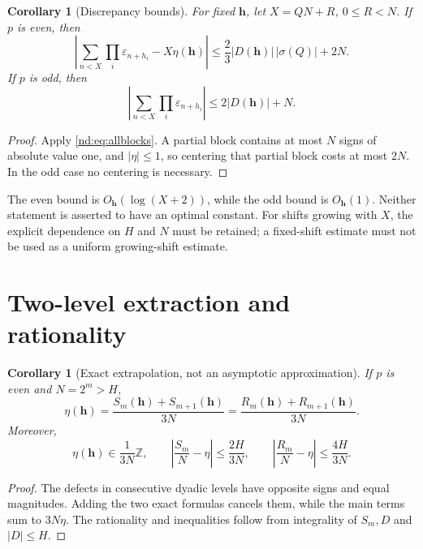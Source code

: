 \documentclass[11pt,a4paper,oneside,openany]{book}
\numberwithin{equation}{chapter}
\newtheorem{corollary}[theorem]{Corollary}
\theoremstyle{definition}
\theoremstyle{remark}
\newcommand{\eps}{\varepsilon}
\newcommand{\ZZ}{\mathbb Z}
\begin{document}
\begin{corollary}[Discrepancy bounds]
For fixed \(\bm h\), let \(X=QN+R\), \(0\le R<N\). If \(p\) is even, then
\begin{equation}
 \left|\sum_{n<X}\prod_i\eps_{n+h_i}-X\eta(\bm h)\right|
 \le \frac23|D(\bm h)|\,|\sigma(Q)|+2N.
 \label{nd:eq:disc-even}
\end{equation}
If \(p\) is odd, then
\begin{equation}
 \left|\sum_{n<X}\prod_i\eps_{n+h_i}\right|
 \le 2|D(\bm h)|+N.
 \label{nd:eq:disc-odd}
\end{equation}
\end{corollary}
\begin{proof}
Apply \eqref{nd:eq:allblocks}. A partial block contains at most \(N\) signs of
absolute value one, and \(|\eta|\le1\), so centering that partial block costs
at most \(2N\). In the odd case no centering is necessary.
\end{proof}

The even bound is \(O_{\bm h}(\log(X+2))\), while the odd bound is
\(O_{\bm h}(1)\). Neither statement is asserted to have an optimal constant.
For shifts growing with \(X\), the explicit dependence on \(H\) and \(N\) must
be retained; a fixed-shift estimate must not be used as a uniform growing-shift
estimate.

\section{Two-level extraction and rationality}
\begin{corollary}[Exact extrapolation, not an asymptotic approximation]
If \(p\) is even and \(N=2^m>H\),
\begin{equation}
 \eta(\bm h)=\frac{S_m(\bm h)+S_{m+1}(\bm h)}{3N}
           =\frac{R_m(\bm h)+R_{m+1}(\bm h)}{3N}.
 \label{nd:eq:twolevels}
\end{equation}
Moreover,
\begin{equation}
 \eta(\bm h)\in\frac1{3N}\ZZ,\qquad
 \left|\frac{S_m}N-\eta\right|\le\frac{2H}{3N},\qquad
 \left|\frac{R_m}N-\eta\right|\le\frac{4H}{3N}.
 \label{nd:eq:ratbound}
\end{equation}
\end{corollary}
\begin{proof}
The defects in consecutive dyadic levels have opposite signs and equal
magnitudes. Adding the two exact formulas cancels them, while the main terms
sum to \(3N\eta\). The rationality and inequalities follow from integrality of
\(S_m,D\) and \(|D|\le H\).
\end{proof}
\end{document}
